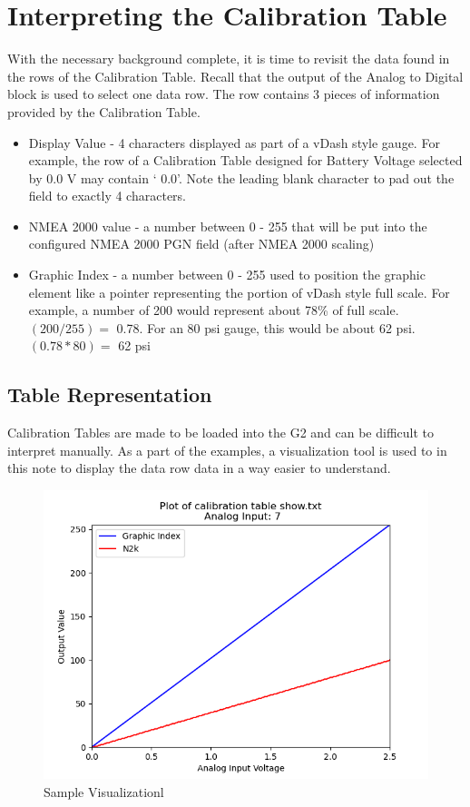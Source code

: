 \documentclass[12pt, letterpaper, twoside, titlepage]{article}
\begin{document}
\section{Interpreting the Calibration Table}
With the necessary background complete, it is time to revisit the data found in the rows of the Calibration Table.  Recall that the output of the Analog to Digital block is used to select one data row. The row contains 3 pieces of information provided by the Calibration Table.

\begin{itemize}
\item Display Value - 4 characters displayed as part of a vDash style gauge. For example, the row of a Calibration Table designed for Battery Voltage selected by 0.0 V may contain ‘ 0.0’. Note the leading blank character to pad out the field to exactly 4 characters.
\item NMEA 2000 value - a number between 0 - 255 that will be put into the configured NMEA 2000 PGN field (after NMEA 2000 scaling) 
\item Graphic Index - a number between 0 - 255 used to position the graphic element like a pointer representing the portion of vDash style full scale. For example, a number of 200 would represent about 78\% of full scale. $ (200 / 255) = $ 0.78.   For an 80 psi gauge, this would be about 62 psi.  $(0.78 * 80) = $ 62 psi
\end{itemize}

\subsection{Table Representation}
Calibration Tables are made to be loaded into the G2 and can be difficult to interpret manually.  As a part of the examples, a visualization tool is used to in this note to display the data row data in a way easier to understand.

\begin{figure}[hbt!]
  \includegraphics[width=\linewidth]{show.txt.png}
  \centering
  \caption{Sample Visualizationl}
  \label{fig:Sample}
\end{figure}
\end{document}
